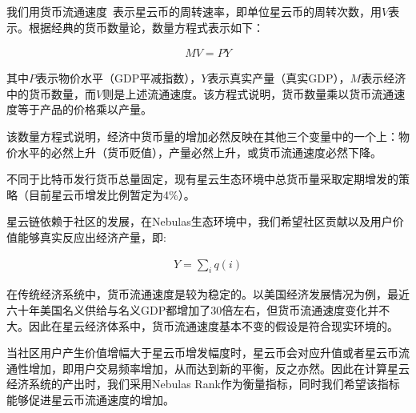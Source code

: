 我们用货币流通速度~\cite{selden}表示星云币的周转速率，即单位星云币的周转次数，用$V$表示。根据经典的货币数量论，数量方程式表示如下：

\begin{align}
MV=PY
\end{align}

其中$P$表示物价水平（GDP平减指数），$Y$表示真实产量（真实GDP），$M$表示经济中的货币数量，而$V$则是上述流通速度。该方程式说明，货币数量乘以货币流通速度等于产品的价格乘以产量。

该数量方程式说明，经济中货币量的增加必然反映在其他三个变量中的一个上：物价水平的必然上升（货币贬值），产量必然上升，或货币流通速度必然下降。

不同于比特币发行货币总量固定，现有星云生态环境中总货币量采取定期增发的策略（目前星云币增发比例暂定为4\%）。


星云链依赖于社区的发展，在Nebulas生态环境中，我们希望社区贡献以及用户价值能够真实反应出经济产量，即:

\begin{align}
Y=\sum_i q(i)
\end{align}

在传统经济系统中，货币流通速度是较为稳定的。以美国经济发展情况为例，最近六十年美国名义供给与名义GDP都增加了30倍左右，但货币流通速度变化并不大。因此在星云经济体系中，货币流通速度基本不变的假设是符合现实环境的。

当社区用户产生价值增幅大于星云币增发幅度时，星云币会对应升值或者星云币流通性增加，即用户交易频率增加，从而达到新的平衡，反之亦然。因此在计算星云经济系统的产出时，我们采用Nebulas Rank作为衡量指标，同时我们希望该指标能够促进星云币流通速度的增加。


